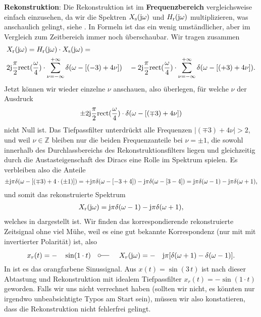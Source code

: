 \begin{Loesung}
\textbf{Rekonstruktion}:
Die Rekonstruktion ist im \textbf{Frequenzbereich} vergleichsweise einfach einzusehen,
da wir die Spektren $X_\mathrm{s}(\im\omega)$ und $H_\mathrm{r}(\im\omega)$
multiplizieren, was anschaulich gelingt, siehe
.
In Formeln ist das ein wenig umständlicher, aber im Vergleich zum Zeitbereich immer
noch überschaubar. Wir tragen zusammen
\begin{align}
&X_\mathrm{r}(\im\omega) =
H_\mathrm{r}(\mathrm{j}\omega) \cdot X_\mathrm{s}(\im\omega) =\\
&2\im
\frac{\pi}{2}\mathrm{rect}(\frac{\omega}{4}) \cdot \sum_{\nu=-\infty}^{+\infty} \delta(\omega - [(-3)+4\nu])
\quad-
2\im
\frac{\pi}{2}\mathrm{rect}(\frac{\omega}{4}) \cdot \sum_{\nu=-\infty}^{+\infty} \delta(\omega - [(+3)+4\nu]).
\end{align}
%
Jetzt können wir wieder einzelne $\nu$ anschauen, also überlegen, für welche $\nu$
der Ausdruck
\begin{equation}
\pm 2\im \frac{\pi}{2}\mathrm{rect}(\frac{\omega}{4}) \cdot \delta(\omega - [(\mp 3)+4\nu])
\end{equation}
nicht Null ist. Das Tiefpassfilter unterdrückt alle Frequenzen $|(\mp 3)+4\nu|>2$,
und weil $\nu\in\mathbb{Z}$ bleiben nur die beiden Frequenzanteile bei $\nu=\pm 1$,
die sowohl innerhalb des Durchlassbereichs des Rekonstruktionsfilters liegen
und gleichzeitig durch die Austasteigenschaft des Diracs eine Rolle im Spektrum
spielen. Es verbleiben also die Anteile
\begin{equation}
\pm \im \pi  \delta(\omega - [(\mp 3)+4 \cdot (\pm 1)]) =
+ \im \pi  \delta(\omega - [-3+4]) - \im \pi  \delta(\omega - [3-4])=
\im \pi  \delta(\omega - 1) - \im \pi  \delta(\omega + 1),
\end{equation}
und somit das rekonstruierte Spektrum
\begin{align}
X_\mathrm{r}(\im\omega) = \im \pi  \delta(\omega - 1) - \im \pi  \delta(\omega + 1),
\end{align}
welches in  dargestellt ist.
Wir finden das korrespondierende rekonstruierte Zeitsignal ohne viel Mühe, weil
es eine gut bekannte Korrespondenz (nur mit mit invertierter Polarität) ist, also
\begin{equation}
x_r(t) = -\quad\sin(1\cdot t) \quad\fourier\quad X_r(\mathrm{j} \omega) =
 -\quad\mathrm{j} \pi [\delta(\omega+1) - \delta(\omega-1)].
\end{equation}
In  ist es das orangfarbene Sinussignal.
Aus $x(t)=\sin(3\,t)$ ist nach dieser Abtastung und Rekonstruktion mit idealem
Tiefpassfilter $x_r(t) = -\sin(1\cdot t)$ geworden. Falls wir uns nicht verrechnet
haben (sollten wir nicht, es könnten nur irgendwo unbeabsichtigte Typos am Start sein),
müssen wir also konstatieren, dass die Rekonstruktion nicht fehlerfrei gelingt.


\end{Loesung}

